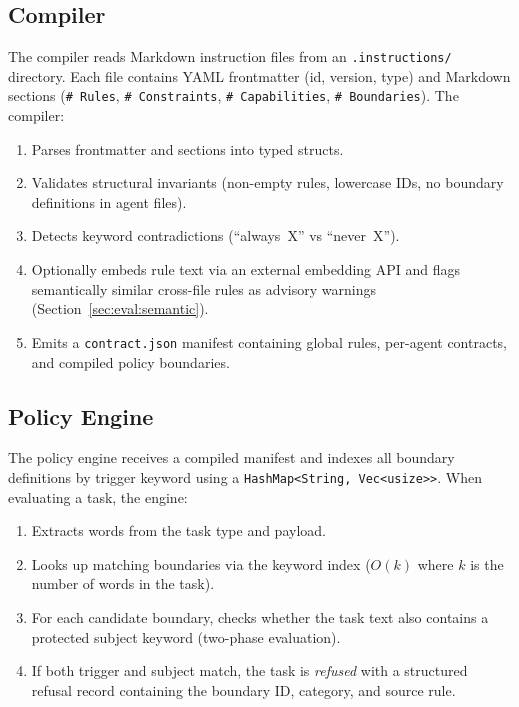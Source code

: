 \documentclass[11pt,a4paper]{article}
\begin{document}
\subsection{Compiler}

The compiler reads Markdown instruction files from an \texttt{.instructions/}
directory. Each file contains YAML frontmatter (id, version, type) and
Markdown sections (\texttt{\# Rules}, \texttt{\# Constraints},
\texttt{\# Capabilities}, \texttt{\# Boundaries}). The compiler:

\begin{enumerate}[nosep]
  \item Parses frontmatter and sections into typed structs.
  \item Validates structural invariants (non-empty rules, lowercase IDs,
    no boundary definitions in agent files).
  \item Detects keyword contradictions (``always~X'' vs ``never~X'').
  \item Optionally embeds rule text via an external embedding API and
    flags semantically similar cross-file rules as advisory warnings
    (Section~\ref{sec:eval:semantic}).
  \item Emits a \texttt{contract.json} manifest containing global rules,
    per-agent contracts, and compiled policy boundaries.
\end{enumerate}

\subsection{Policy Engine}

The policy engine receives a compiled manifest and indexes all boundary
definitions by trigger keyword using a \texttt{HashMap<String, Vec<usize>>}.
When evaluating a task, the engine:

\begin{enumerate}[nosep]
  \item Extracts words from the task type and payload.
  \item Looks up matching boundaries via the keyword index ($O(k)$ where
    $k$ is the number of words in the task).
  \item For each candidate boundary, checks whether the task text also
    contains a protected subject keyword (two-phase evaluation).
  \item If both trigger and subject match, the task is \emph{refused} with
    a structured refusal record containing the boundary ID, category, and
    source rule.
\end{enumerate}
\end{document}
